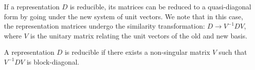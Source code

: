 If a representation $D$ is reducible, its matrices can be reduced to a
quasi-diagonal form by going under the new system of unit vectors.
We note that in this case, the representation matrices undergo the similarity
transformation: $D\rightarrow V^{-1}DV$, where $V$ is the unitary matrix relating
the unit vectors of the old and new basis.

A representation $D$ is reducible if there exists a non-singular matrix $V$
such that $V^{-1}DV$ is block-diagonal.

